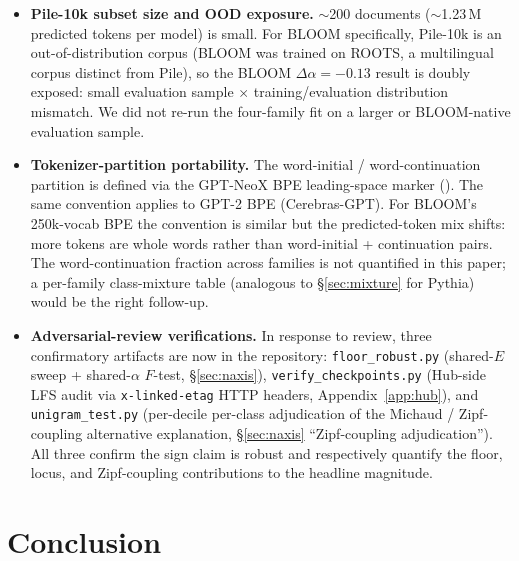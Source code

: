 \documentclass[10pt]{article}
\newcommand{\dalpha}{\Delta\alpha}
\begin{document}
\begin{itemize}
        Part of the ``$|\dalpha_D|$ grows with $N$'' pattern
        (Table~\ref{tab:daxis}) is therefore consistent with an
        $N$-axis confound rather than with a genuine $N$-dependent
        $D$-axis slope.
  \item \textbf{Pile-10k subset size and OOD exposure.}
        $\sim$200 documents ($\sim$1.23\,M predicted tokens per model)
        is small. For BLOOM specifically, Pile-10k is an
        out-of-distribution corpus (BLOOM was trained on ROOTS, a
        multilingual corpus distinct from Pile), so the BLOOM
        $\dalpha = -0.13$ result is doubly exposed: small evaluation
        sample $\times$ training/evaluation distribution mismatch. We
        did not re-run the four-family fit on a larger or
        BLOOM-native evaluation sample.
  \item \textbf{Tokenizer-partition portability.} The word-initial /
        word-continuation partition is defined via the GPT-NeoX BPE
        leading-space marker (\texttt{}). The same convention
        applies to GPT-2 BPE (Cerebras-GPT). For BLOOM's 250k-vocab
        BPE the convention is similar but the predicted-token mix
        shifts: more tokens are whole words rather than word-initial
        + continuation pairs. The word-continuation fraction across
        families is not quantified in this paper; a per-family
        class-mixture table (analogous to \S\ref{sec:mixture} for
        Pythia) would be the right follow-up.
  \item \textbf{Adversarial-review verifications.} In response to
        review, three confirmatory artifacts are now in the
        repository: \texttt{floor\_robust.py} (shared-$E$ sweep +
        shared-$\alpha$ $F$-test, \S\ref{sec:naxis}),
        \texttt{verify\_checkpoints.py} (Hub-side LFS audit via
        \texttt{x-linked-etag} HTTP headers, Appendix~\ref{app:hub}),
        and \texttt{unigram\_test.py} (per-decile per-class
        adjudication of the Michaud / Zipf-coupling alternative
        explanation, \S\ref{sec:naxis} ``Zipf-coupling
        adjudication''). All three confirm the sign claim is robust
        and respectively quantify the floor, locus, and Zipf-coupling
        contributions to the headline magnitude.
\end{itemize}

\section{Conclusion}
\end{document}
